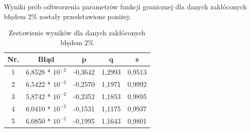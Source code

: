 \documentclass[twoside]{projektInzynierskiMS1}
\newcounter{rowcnt}
\newcommand\rownum{\ifnumequal{\value{rowcnt}}{0}{\textbf{Nr.}}{\therowcnt.}\refstepcounter{rowcnt}}
\newcommand{\newLine}{~\\}
\begin{document}



Wyniki prób odtworzenia parametrów funkcji granicznej dla danych zakłóconych błędem 2\% zostały przedstawione poniżej: \\

\begin{table}[htbp]\centering
\def\sym#1{\ifmmode^{#1}\else\(^{#1}\)\fi}
\caption{Zestawienie wyników dla danych zakłóconych błędem 2\%}
\renewcommand\arraystretch{1.333}
\begin{tabular}{|c|c|c|c|c|} 
                  \hline
\textbf{Nr.}& \textbf{Błąd} &\textbf{p} & \textbf{q} & \textbf{s}\\ \hline
1& 6,8528 * $10^{-2}$  & -0,3642 & 1,2993  & 0,9513 \\ \hline 
2& 6,5422 * $10^{-2}$  & -0,2570 & 1,1971  & 0,9992 \\ \hline 
3& 5,8742 * $10^{-2}$  & -0,2352 & 1,1853  & 0,9895 \\ \hline 
4& 6,0410 * $10^{-2}$  & -0,1531 & 1,1175  & 0,9937 \\ \hline 
5& 6,0850 * $10^{-2}$  & -0,1995 & 1,1643  & 0,9801 \\ \hline 
\end{tabular}
\end{table}
\end{document}
